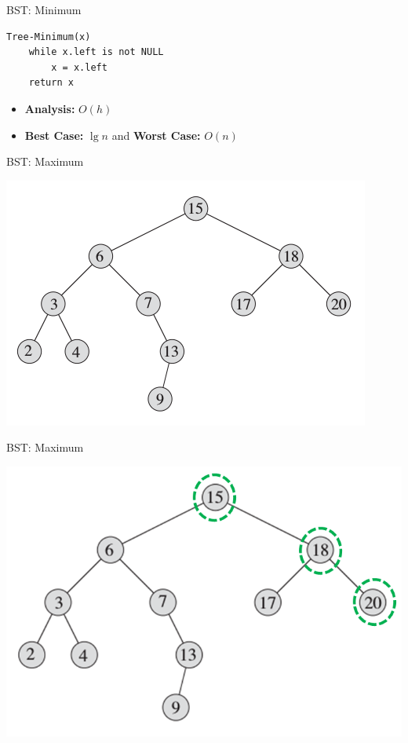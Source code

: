 \documentclass{beamer}
\begin{document}
\begin{frame}[fragile]{BST: Minimum}
\begin{verbatim}
Tree-Minimum(x)
    while x.left is not NULL
        x = x.left
    return x
\end{verbatim}
    \begin{itemize}
        \item {\bf Analysis:} $O(h)$ 
        \item {\bf Best Case:} $\lg n$ and {\bf Worst Case:} $O(n)$
    \end{itemize}
\end{frame}


\begin{frame}{BST: Maximum}

    \begin{center}
        \includegraphics[scale=0.6]{bstMaximum.png}
    \end{center}
\end{frame}


\begin{frame}{BST: Maximum}

    \begin{center}
        \includegraphics[scale=0.6]{bstMaximum2.png}
    \end{center}
\end{frame}
\end{document}
